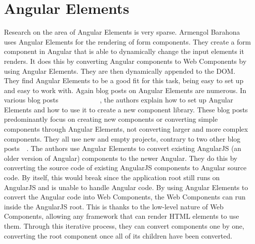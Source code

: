 \section{Angular Elements}
Research on the area of Angular Elements is very sparse. Armengol Barahona \etal{}~\cite{armengol2020development} uses Angular Elements for the rendering of form components. They create a form component in Angular that is able to dynamically change the input elements it renders. It does this by converting Angular components to Web Components by using Angular Elements. They are then dynamically appended to the DOM. They find Angular Elements to be a good fit for this task, being easy to set up and easy to work with.
Again blog posts on Angular Elements are numerous. In various blog posts~~~~~~~~~~~~, the authors explain how to set up Angular Elements and how to use it to create a new component library. These blog posts predominantly focus on creating new components or converting simple components through Angular Elements, not converting larger and more complex components. They all use new and empty projects, contrary to two other blog posts~~. The authors use Angular Elements to convert existing AngularJS (an older version of Angular) components to the newer Angular. They do this by converting the source code of existing AngularJS components to Angular source code. By itself, this would break since the application root still runs on AngularJS and is unable to handle Angular code. By using Angular Elements to convert the Angular code into Web Components, the Web Components can run inside the AngularJS root. This is thanks to the low-level nature of Web Components, allowing any framework that can render HTML elements to use them. Through this iterative process, they can convert components one by one, converting the root component once all of its children have been converted.

